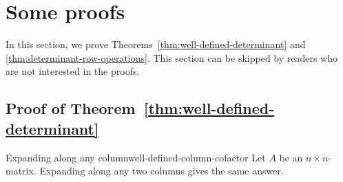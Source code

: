 \section{Some proofs}

In this section, we prove Theorems~\ref{thm:well-defined-determinant}
and {\ref{thm:determinant-row-operations}}. This section can be
skipped by readers who are not interested in the proofs.

\subsection{Proof of Theorem~\ref{thm:well-defined-determinant}}

\begin{lemma}{Expanding along any column}{well-defined-column-cofactor}
  Let $A$ be an $n\times n$-matrix. Expanding along any two columns
  gives the same answer.
\end{lemma}

